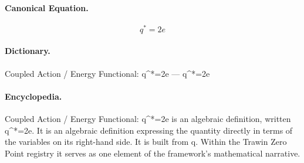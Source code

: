 \paragraph{Canonical Equation.}
\[
q^*=2e
\]

\paragraph{Dictionary.}
Coupled Action / Energy Functional: q\textasciicircum{}*=2e — q\textasciicircum{}*=2e

\paragraph{Encyclopedia.}
Coupled Action / Energy Functional: q\textasciicircum{}*=2e is an algebraic definition, written q\textasciicircum{}*=2e. It is an algebraic definition expressing the quantity directly in terms of the variables on its right-hand side. It is built from q. Within the Trawin Zero Point registry it serves as one element of the framework's mathematical narrative.

